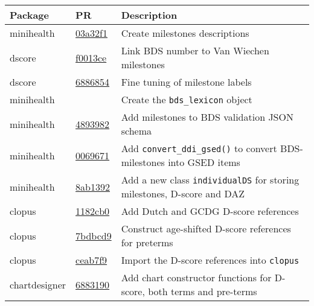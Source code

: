 \documentclass[
]{book}
\begin{document}
\begin{longtable}[]{@{}
  >{\raggedright\arraybackslash}p{}
  >{\raggedright\arraybackslash}p{}
  >{\raggedright\arraybackslash}p{}@{}}
\toprule
Package & PR & Description \\
\midrule
\endhead
minihealth & \href{https://github.com/stefvanbuuren/minihealth/commit/03a32f1960e81a685bb749911e6ea297684ab4dc}{03a32f1} & Create milestones descriptions \\
dscore & \href{https://github.com/stefvanbuuren/dscore/commit/f0013ce9a02d34ad25dd5c101c6a7c5b1444b53b}{f0013ce} & Link BDS number to Van Wiechen milestones \\
dscore & \href{https://github.com/stefvanbuuren/dscore/commit/688685477082ac6c040b9d18035b5178a39a5cc0}{6886854} & Fine tuning of milestone labels \\
minihealth & & Create the \texttt{bds\_lexicon} object \\
minihealth & \href{https://github.com/stefvanbuuren/minihealth/commit/4893982631717539b070c8d19b88b2b10319f2ee}{4893982} & Add milestones to BDS validation JSON schema \\
minihealth & \href{https://github.com/stefvanbuuren/minihealth/commit/0069671c8d09f64f2436faa93b764bd288324fcc}{0069671} & Add \texttt{convert\_ddi\_gsed()} to convert BDS-milestones into GSED items \\
minihealth & \href{https://github.com/stefvanbuuren/minihealth/commit/8ab1392fdbe781adfa004fcadb4f661c14487cf2}{8ab1392} & Add a new class \texttt{individualDS} for storing milestones, D-score and DAZ \\
clopus & \href{https://github.com/stefvanbuuren/clopus/commit/1182cb02508a3207c0c9bcb35232851c38d24179}{1182cb0} & Add Dutch and GCDG D-score references \\
clopus & \href{https://github.com/stefvanbuuren/clopus/commit/7bdbcd9629bb215f466bbc2e2f886b6f16c5b5e9}{7bdbcd9} & Construct age-shifted D-score references for preterms \\
clopus & \href{https://github.com/stefvanbuuren/clopus/commit/ceab7f9547b9ae843a97b640d920ea0c36185053}{ceab7f9} & Import the D-score references into \texttt{clopus} \\
chartdesigner & \href{https://github.com/stefvanbuuren/chartdesigner/commit/68831906cef5cdca0d8851b057a01cc8be4fff6d}{6883190} & Add chart constructor functions for D-score, both terms and pre-terms \\

\end{longtable}
\end{document}
